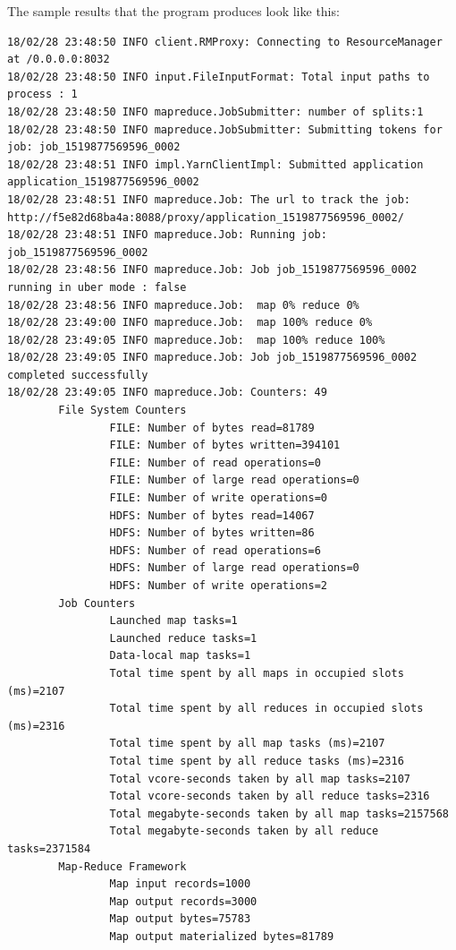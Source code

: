 The sample results that the program produces look like this:

\begin{lstlisting}
18/02/28 23:48:50 INFO client.RMProxy: Connecting to ResourceManager at /0.0.0.0:8032
18/02/28 23:48:50 INFO input.FileInputFormat: Total input paths to process : 1
18/02/28 23:48:50 INFO mapreduce.JobSubmitter: number of splits:1
18/02/28 23:48:50 INFO mapreduce.JobSubmitter: Submitting tokens for job: job_1519877569596_0002
18/02/28 23:48:51 INFO impl.YarnClientImpl: Submitted application application_1519877569596_0002
18/02/28 23:48:51 INFO mapreduce.Job: The url to track the job: http://f5e82d68ba4a:8088/proxy/application_1519877569596_0002/
18/02/28 23:48:51 INFO mapreduce.Job: Running job: job_1519877569596_0002
18/02/28 23:48:56 INFO mapreduce.Job: Job job_1519877569596_0002 running in uber mode : false
18/02/28 23:48:56 INFO mapreduce.Job:  map 0% reduce 0%
18/02/28 23:49:00 INFO mapreduce.Job:  map 100% reduce 0%
18/02/28 23:49:05 INFO mapreduce.Job:  map 100% reduce 100%
18/02/28 23:49:05 INFO mapreduce.Job: Job job_1519877569596_0002 completed successfully
18/02/28 23:49:05 INFO mapreduce.Job: Counters: 49
        File System Counters
                FILE: Number of bytes read=81789
                FILE: Number of bytes written=394101
                FILE: Number of read operations=0
                FILE: Number of large read operations=0
                FILE: Number of write operations=0
                HDFS: Number of bytes read=14067
                HDFS: Number of bytes written=86
                HDFS: Number of read operations=6
                HDFS: Number of large read operations=0
                HDFS: Number of write operations=2
        Job Counters
                Launched map tasks=1
                Launched reduce tasks=1
                Data-local map tasks=1
                Total time spent by all maps in occupied slots (ms)=2107
                Total time spent by all reduces in occupied slots (ms)=2316
                Total time spent by all map tasks (ms)=2107
                Total time spent by all reduce tasks (ms)=2316
                Total vcore-seconds taken by all map tasks=2107
                Total vcore-seconds taken by all reduce tasks=2316
                Total megabyte-seconds taken by all map tasks=2157568
                Total megabyte-seconds taken by all reduce tasks=2371584
        Map-Reduce Framework
                Map input records=1000
                Map output records=3000
                Map output bytes=75783
                Map output materialized bytes=81789

\end{lstlisting}
